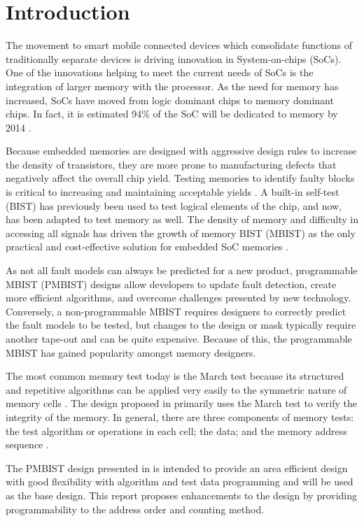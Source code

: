 \chapter{Introduction}
\label{chap:introduction}
The movement to smart mobile connected devices which consolidate functions of traditionally separate devices is driving innovation in System-on-chips (SoCs).  One of the innovations helping to meet the current needs of SoCs is the integration of larger memory with the processor.  As the need for memory has increased, SoCs have moved from logic dominant chips to memory dominant chips.  In fact, it is estimated 94\% of the SoC will be dedicated to memory by 2014 \cite{1327984}.

Because embedded memories are designed with aggressive design rules to increase the density of transistors, they are more prone to manufacturing defects that negatively affect the overall chip yield.  Testing memories to identify faulty blocks is critical to increasing and maintaining acceptable yields \cite{1395663}. 
A built-in self-test (BIST) has previously been used to test logical elements of the chip, and now, has been adapted to test memory as well.  The density of memory and difficulty in accessing all signals has driven the growth of memory BIST (MBIST) as the only practical and cost-effective solution for embedded SoC memories \cite{5875994}.  

As not all fault models can always be predicted for a new product, programmable MBIST (PMBIST) designs allow developers to update fault detection, create more efficient algorithms, and overcome challenges presented by new technology.  Conversely, a non-programmable MBIST requires designers to correctly predict the fault models to be tested, but changes to the design or mask typically require another tape-out and can be quite expensive.  Because of this, the programmable MBIST has gained popularity amongst memory designers. 

The most common memory test today is the March test because its structured and repetitive algorithms can be applied very easily to the symmetric nature of memory cells \cite{1675150}.  The design proposed in \cite{1584083} primarily uses the March test to verify the integrity of the memory.  In general, there are three components of memory tests: the test algorithm or operations in each cell; the data; and the memory address sequence \cite{5993815}.  

The PMBIST design presented in \cite{1584083} is intended to provide an area efficient design with good flexibility with algorithm and test data programming and will be used as the base design. This report proposes enhancements to the design by providing programmability to the address order and counting method.  

